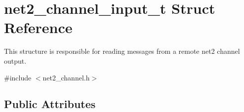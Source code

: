 \hypertarget{structnet2__channel__input__t}{\section{net2\-\_\-channel\-\_\-input\-\_\-t Struct Reference}
\label{structnet2__channel__input__t}
}


This structure is responsible for reading messages from a remote net2 channel output.  




{\ttfamily \#include $<$net2\-\_\-channel.\-h$>$}

\subsection*{Public Attributes}
